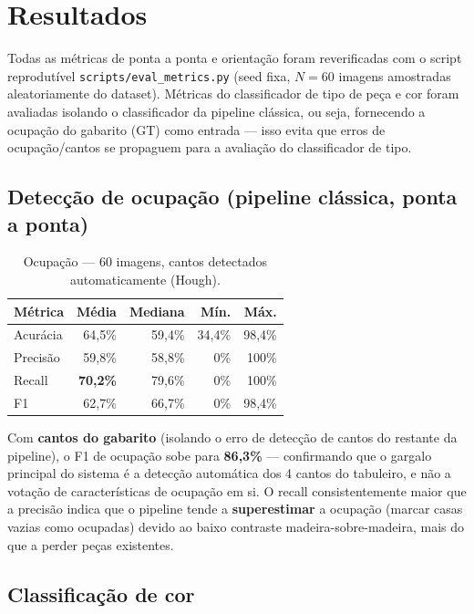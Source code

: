 \section{Resultados}
\label{sec:resultados}

Todas as métricas de ponta a ponta e orientação foram reverificadas com o script
reprodutível \texttt{scripts/eval\_metrics.py} (seed fixa, $N=60$ imagens amostradas
aleatoriamente do dataset). Métricas do classificador de tipo de peça e cor foram
avaliadas isolando o classificador da pipeline clássica, ou seja, fornecendo a ocupação
do gabarito (GT) como entrada --- isso evita que erros de ocupação/cantos se propaguem
para a avaliação do classificador de tipo.

\subsection{Detecção de ocupação (pipeline clássica, ponta a ponta)}

\begin{table}[H]
\centering
\caption{Ocupação --- 60 imagens, cantos detectados automaticamente (Hough).}
\begin{tabular}{@{}lrrrr@{}}
\toprule
Métrica & Média & Mediana & Mín. & Máx. \\
\midrule
Acurácia & 64,5\% & 59,4\% & 34,4\% & 98,4\% \\
Precisão & 59,8\% & 58,8\% & 0\% & 100\% \\
Recall   & \textbf{70,2\%} & 79,6\% & 0\% & 100\% \\
F1       & 62,7\% & 66,7\% & 0\% & 98,4\% \\
\bottomrule
\end{tabular}
\end{table}

Com \textbf{cantos do gabarito} (isolando o erro de detecção de cantos do restante da
pipeline), o F1 de ocupação sobe para \textbf{86,3\%} --- confirmando que o gargalo
principal do sistema é a detecção automática dos 4 cantos do tabuleiro, e não a votação
de características de ocupação em si. O recall consistentemente maior que a precisão
indica que o pipeline tende a \textbf{superestimar} a ocupação (marcar casas vazias como
ocupadas) devido ao baixo contraste madeira-sobre-madeira, mais do que a perder peças
existentes.

\subsection{Classificação de cor}

